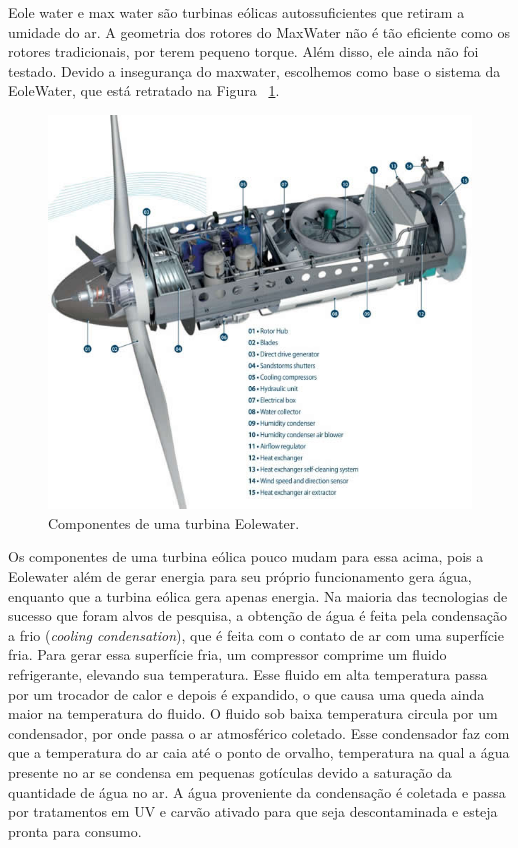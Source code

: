 Eole water e max water são turbinas eólicas autossuficientes que retiram a umidade do ar. A geometria dos rotores do MaxWater
não é tão eficiente como os rotores tradicionais, por terem pequeno torque. Além disso, ele ainda não foi testado. Devido a 
insegurança do maxwater, escolhemos como base o sistema da EoleWater, que está retratado na Figura ~\ref{Eole_Water}.

\begin{figure}[!htbp]
\centering
\includegraphics[scale=0.6]{editaveis/figuras/Componentes}
\caption[Componentes de uma turbina Eolewater.]{Componentes de uma turbina Eolewater.\footnotemark}
\FloatBarrier
\label{Eole_Water}
\end{figure}


Os componentes de uma turbina eólica pouco mudam para essa acima, pois a Eolewater além de gerar energia para seu próprio
funcionamento gera água, enquanto que a turbina eólica gera apenas energia. Na maioria das tecnologias de sucesso que foram alvos de pesquisa,
a obtenção de água é feita pela condensação  a frio (\textit{cooling condensation}), que é feita com o contato de 
ar com uma superfície fria. Para gerar essa superfície fria, um compressor comprime um fluido refrigerante, elevando sua
temperatura. Esse fluido em alta temperatura passa por um trocador de calor e depois é expandido, o que causa uma queda 
ainda maior na temperatura do fluido. O fluido sob baixa temperatura circula por um condensador, por onde passa o ar 
atmosférico coletado. Esse condensador faz com que a temperatura do ar caia até o ponto de orvalho, temperatura na qual a
água presente no ar se condensa em pequenas gotículas devido a saturação da quantidade de água no ar. A água proveniente
da condensação é coletada e passa por tratamentos em UV e carvão ativado para que seja descontaminada e esteja pronta para
consumo.



